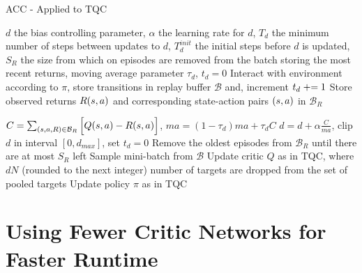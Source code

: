 \begin{algorithm}[t]
   \caption{ACC - Applied to TQC}
   \label{alg:acc_applied_to_tqc}
\begin{algorithmic}
    $d$ the bias controlling parameter, $\alpha$ the learning rate for $d$, $T_d$ the minimum number of steps between updates to $d$, $T_d^{init}$  the initial steps before $d$ is updated,
   $S_R$ the size from which on episodes are removed from the batch storing the most recent returns, moving average parameter $\tau_d$, $t_d = 0$
   \STATE Interact with environment according to $\pi$, store transitions in replay buffer $\mathcal{B}$ and, increment $t_d \mathrel{+}= 1$
   \STATE Store observed returns $R(s, a)$ and corresponding state-action pairs $(s, a)$ in $\mathcal{B}_R$

   
   \STATE $C = \sum_{ (s,a, R) \in \mathcal{B}_R} \Big[   Q (s, a) - R (s, a)  \Big]$,     $ma = (1-\tau_d) ma + \tau_d C$
   \STATE $d = d + \alpha \frac{C}{ma}$, clip $d$ in interval $[0, d_{max}]$, set $t_d=0$
    \STATE Remove the oldest episodes from $\mathcal{B}_R$ until there are at most $S_R$ left
   \ENDIF
   \ENDIF
   \STATE Sample mini-batch from $\mathcal{B}$
   \STATE Update critic $Q$ as in TQC, where $dN$ (rounded to the next integer) number of targets are dropped from the set of pooled targets 
   \STATE Update policy $\pi$ as in TQC 
  \ENDFOR
\end{algorithmic}
\end{algorithm}


 


\section{Using Fewer Critic Networks for Faster Runtime}
\label{app:2_nets}

